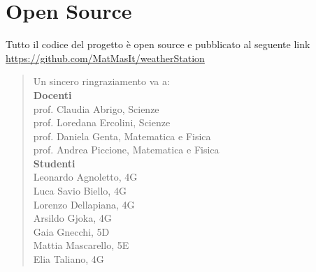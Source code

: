 \documentclass{article}
\begin{document}
\section{Open Source}
Tutto il codice del progetto è open source e pubblicato al seguente link\\
\url{https://github.com/MatMasIt/weatherStation}
\pagebreak
\renewcommand{\abstractname}{Riconoscimenti}
\begin{center}
\begin{abstract}
Un sincero ringraziamento va a:\\
\textbf{Docenti}\\
 prof. Claudia Abrigo, Scienze\\
 prof. Loredana Ercolini, Scienze\\
 prof. Daniela Genta, Matematica e Fisica\\
 prof. Andrea Piccione, Matematica e Fisica\\
\textbf{Studenti}\\
Leonardo Agnoletto, 4G\\
Luca Savio Biello, 4G\\
Lorenzo Dellapiana, 4G\\
Arsildo Gjoka, 4G\\
Gaia Gnecchi, 5D\\
Mattia Mascarello, 5E\\
Elia Taliano, 4G
\end{abstract}
\end{center}
\end{document}
